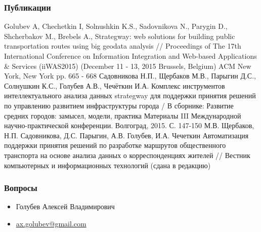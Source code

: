 \begin{frame}
    \frametitle{Публикации}
    \scriptsize
    \begin{thebibliography}{10}
         Golubev A, Chechetkin I, Solnushkin K.S., Sadovnikova N., Parygin D., Shcherbakov M., 
            Brebels A., Strategway: web solutions for building public transportation routes using big geodata 
            analysis // Proceedings of The 17th International Conference on Information Integration and 
            Web-based Applications \& Services (iiWAS2015) (December 11 - 13, 2015 Brussels, Belgium) 
            ACM New York, New York pp. 665 - 668
         Садовникова Н.П., Щербаков М.В., Парыгин Д.С., Солнушкин К.С., Голубев А.В., 
            Чечёткин И.А. Комплекс инструментов интеллектуального анализа данных strategway для поддержки 
            принятия решений по управлению развитием инфраструктуры города / В сборнике: Развитие средних 
            городов: замысел, модели, практика Материалы III Международной научно-практической конференции. Волгоград, 2015. С. 147-150
         М.В. Щербаков, Н.П. Садовникова, Д.С. Парыгин, А.В. Голубев, И.А. Чечеткин 
            Автоматизация поддержки принятия решений по разработке маршрутов общественного транспорта на 
            основе анализа данных о корреспонденциях жителей // Вестник компьютерных и информационных 
            технологий (сдана в редакцию)
    \end{thebibliography}
\end{frame}

\begin{frame}
    \frametitle{Вопросы}
    \begin{itemize}
        \item Голубев Алексей Владимирович
        \item \href{mailto:ax.golubev@gmail.com}{ax.golubev@gmail.com}
    \end{itemize}
\end{frame}
